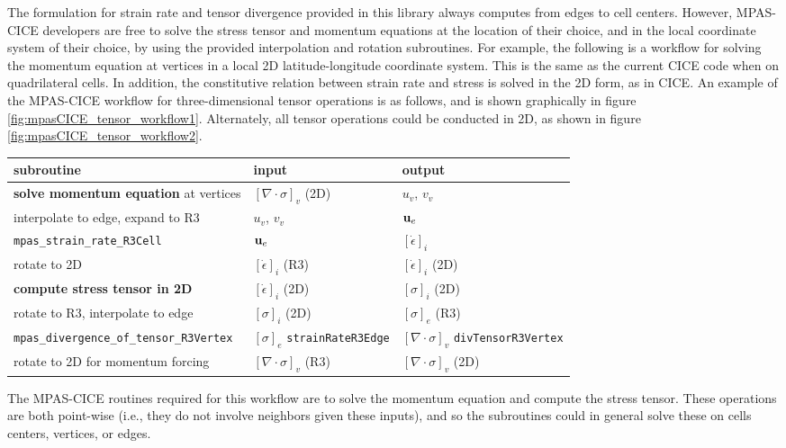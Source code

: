\documentclass[11pt]{report}
\begin{document}
The formulation for strain rate and tensor divergence provided in this library always computes from edges to cell centers.  However, MPAS-CICE developers are free to solve the stress tensor and momentum equations at the location of their choice, and in the local coordinate system of their choice, by using the provided interpolation and rotation subroutines. For example, the following is a workflow for solving the momentum equation at vertices in a local 2D latitude-longitude coordinate system.  This is the same as the current CICE code when on quadrilateral cells.  In addition, the constitutive relation between strain rate and stress is solved in the 2D form, as in CICE.  An example of the MPAS-CICE workflow for three-dimensional tensor operations is as follows, and is shown graphically in figure \ref{fig:mpasCICE_tensor_workflow1}.  Alternately, all tensor operations could be conducted in 2D, as shown in figure \ref{fig:mpasCICE_tensor_workflow2}.\\
\begin{tabular}{ |l| l| l| }
\hline
  {\bf subroutine} &  {\bf input} &  {\bf output} \\
\hline
{\bf solve momentum equation} at vertices &$[\nabla \cdot \sigma]_v$ (2D) & $u_v$, $v_v$\\
interpolate to edge, expand to R3 & $u_v$, $v_v$ & ${\bf u}_e$ \\
\verb|mpas_strain_rate_R3Cell|   & ${\bf u}_e$ & $\left[\dot\epsilon  \right]_i$ \\
rotate to 2D &  $\left[\dot\epsilon  \right]_i$ (R3) &  $\left[\dot\epsilon  \right]_i$ (2D)\\
{\bf compute stress tensor in 2D} &  $\left[\dot\epsilon  \right]_i$ (2D) &  $\left[\sigma  \right]_i$ (2D)\\
rotate to R3, interpolate to edge  & $\left[\sigma  \right]_i$ (2D) &  $\left[\sigma  \right]_e$ (R3) \\
\verb|mpas_divergence_of_tensor_R3Vertex|   &  $\left[\sigma  \right]_e$ \verb|strainRateR3Edge|& $[\nabla \cdot \sigma]_v$ \verb|divTensorR3Vertex|\\
rotate to 2D for momentum forcing &  $[\nabla \cdot \sigma]_v$ (R3) & $[\nabla \cdot \sigma]_v$ (2D) \\
\hline
\end{tabular}
\vspace{8pt}

The MPAS-CICE routines required for this workflow are to solve the momentum equation and compute the stress tensor.  These operations are both point-wise (i.e., they do not involve neighbors given these inputs), and so the subroutines could in general solve these on cells centers, vertices, or edges.  
\end{document}
